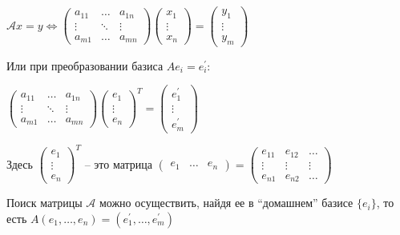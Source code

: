 \documentclass[12pt]{article}
\begin{document}
    $\mathcal{A}x = y \Longleftrightarrow \begin{pmatrix}
         a_{11} & \dots & a_{1n} \\
         \vdots & \ddots & \vdots \\
         a_{m1} & \dots & a_{mn}
    \end{pmatrix} \begin{pmatrix}
         x_1 \\
         \vdots \\
         x_n
    \end{pmatrix} = \begin{pmatrix}
         y_1 \\
         \vdots \\
         y_m
    \end{pmatrix}$

    Или при преобразовании базиса $Ae_i = e^\prime_i$:

    $\begin{pmatrix}
         a_{11} & \dots & a_{1n} \\
         \vdots & \ddots & \vdots \\
         a_{m1} & \dots & a_{mn}
    \end{pmatrix} \begin{pmatrix}
         e_1 \\
         \vdots \\
         e_n
    \end{pmatrix}^T = \begin{pmatrix}
         e_1^\prime \\
         \vdots \\
         e_m^\prime
    \end{pmatrix}$

    Здесь $\begin{pmatrix}
         e_1 \\
         \vdots \\
         e_n
    \end{pmatrix}^T$ -- это матрица $\begin{pmatrix}
         e_1 & \dots & e_n
    \end{pmatrix} = \begin{pmatrix}
         e_{11} & e_{12} & \dots \\
         \vdots & \vdots & \vdots \\
         e_{n1} & e_{n2} & \dots
    \end{pmatrix}$

    \Nota Поиск матрицы $\mathcal{A}$ можно осуществить, найдя ее в \enquote{домашнем} базисе $\{e_i\}$, то есть $A (e_1, \dots, e_n) = (e_1^\prime, \dots, e_m^\prime)$
\end{document}
